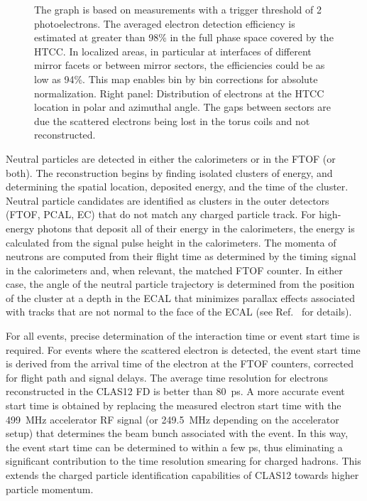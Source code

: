 \documentclass[final,3p,twocolumn]{elsarticle}
\begin{document}
\begin{figure}[th!]
{The graph is based on measurements with a trigger threshold of 2 photoelectrons.
The averaged electron detection efficiency is estimated at greater than 98\% in the full phase space covered by the HTCC. 
In localized areas, in particular at interfaces of different mirror facets or between mirror sectors, the efficiencies could be as low as 
94\%. This map enables bin by bin corrections for absolute normalization. Right panel: Distribution of electrons at the HTCC 
location in polar and azimuthal angle. The gaps between sectors are
  due the scattered electrons being lost in the torus coils and not reconstructed. 
\label{htcc-performance} }
\end{figure}
Neutral particles are detected in either the calorimeters or in the FTOF (or both). The reconstruction begins by
finding isolated clusters of energy, and determining the spatial location, deposited energy, and the time of the
cluster. Neutral particle candidates are identified as clusters in the outer detectors (FTOF, PCAL, EC) that do
not match any charged particle track. For high-energy photons that deposit all of their energy in the calorimeters,
the energy is calculated from the signal pulse height in the calorimeters. The momenta of neutrons are computed
from their flight time as determined by the timing signal in the calorimeters and, when relevant, the matched
FTOF counter. In either case, the angle of the neutral particle trajectory is determined from the position of the
cluster at a depth in the ECAL that minimizes parallax effects associated with tracks that are not normal to the
face of the ECAL (see Ref.~\cite{ECAL} for details).

For all events, precise determination of the interaction time or event start time is required. For events where the
scattered electron is detected, the event start time is derived from the arrival time of the electron at the FTOF
counters, corrected for flight path and signal delays.  The average time resolution for electrons reconstructed in
the CLAS12 FD is better than 80~ps. A more accurate event start time is obtained by replacing the measured
electron start time with the 499~MHz accelerator RF signal (or 249.5~MHz depending on the accelerator setup)
that determines the beam bunch associated with the event. In this way, the event start time can be determined
to within a few ps, thus eliminating a significant contribution to the time resolution smearing for charged hadrons.
This extends the charged particle identification capabilities of CLAS12 towards higher particle momentum.
\end{document}
